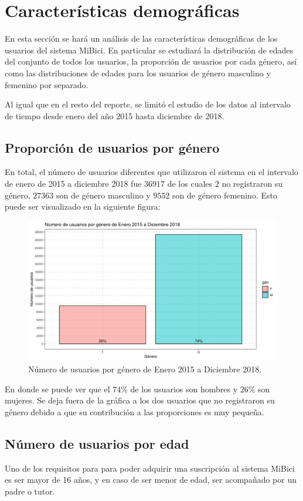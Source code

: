 \section*{Características demográficas}
En esta sección se hará un análisis de las características demográficas de los usuarios del sistema MiBici. En particular se estudiará la distribución de edades del conjunto de todos los usuarios, la proporción de usuarios por cada género, así como las distribuciones de edades para los usuarios de género masculino y femenino por separado.
\par Al igual que en el resto del reporte, se limitó el estudio de los datos al intervalo de tiempo desde enero del año 2015 hasta diciembre de 2018.
\subsection*{Proporción de usuarios por género}
En total, el número de usuarios diferentes que utilizaron el sistema en el intervalo de enero de 2015 a diciembre 2018 fue $36917$ de los cuales $2$ no registraron su género, $27363$ son de género masculino y $9552$ son de género femenino. Esto puede ser visualizado en la siguiente figura:
\begin{figure}[H]
	\centering
	\includegraphics[width=0.7\linewidth]{Graphics/genderProp}
	\caption{Número de usuarios por género de Enero 2015 a Diciembre 2018.}
	\label{fig:genderprop}
\end{figure}
En donde se puede ver que el $74\%$ de los usuarios son hombres y $26\%$ son mujeres. Se deja fuera de la gráfica a los dos usuarios que no registraron su género debido a que su contribución a las proporciones es muy pequeña.
\subsection*{Número de usuarios por edad}
Uno de los requisitos para para poder adquirir una suscripción al sistema MiBici es ser mayor de 16 años, y en caso de ser menor de edad, ser acompañado por un padre o tutor.